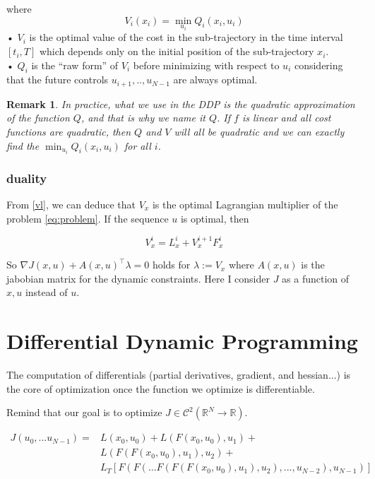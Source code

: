 \documentclass{report}
\newtheorem*{remark}{Remark}
\begin{document}
where
\begin{equation}
V_i(x_i) = \min_{u_i} Q_i(x_i, u_i) 
\end{equation}•
$V_i$ is the optimal value of the cost in the sub-trajectory in the time interval $[t_i, T]$ which depends only on the initial position of the sub-trajectory $x_i$.
\\•
$Q_i$ is the ``raw form'' of $V_i$ before minimizing with respect to $u_i$ considering that the future controls $u_{i+1}, .., u_{N-1}$ are always optimal. 

\begin{remark}
In practice, what we use in the DDP is the quadratic approximation of the function $Q$, and that is why we name it $Q$. If $f$ is linear and all cost functions are quadratic, then $Q$ and $V$ will all be quadratic and we can exactly find the $\min_{u_i} Q_i(x_i, u_i) $ for all $i$.
\end{remark}

\subsection*{duality}
From \ref{vl}, we can deduce that $V_x$ is the optimal Lagrangian multiplier of the problem \ref{eq:problem}.
If the sequence $u$ is optimal, then

\begin{equation}
V_x^i = L_x^i + V_x^{i+1} F_x^i
\end{equation}

So $\nabla J (x, u) + A(x, u)^\top \lambda = 0$ holds for $\lambda  := V_x$ where $A(x,u)$ is the jabobian matrix for the dynamic constraints. Here I consider $J$ as a function of $x, u$ instead of $u$.

\chapter{Differential Dynamic Programming}

The computation of differentials (partial derivatives, gradient, and hessian...) is the core of optimization once the function we optimize is differentiable.

Remind that our goal is to optimize $J \in \mathscr{C}^2 (\mathbb{R}^N \to \mathbb{R})$.

\begin{equation}
\begin{split}
J(u_0, ...u_{N-1}) = &L(x_0, u_0) + L(F(x_0, u_0), u_1) + \\
	&L(F(F(x_0, u_0), u_1), u_2) + \\
	&L_T[F(F(...F(F(F(x_0, u_0), u_1), u_2), ..., u_{N-2}) ,u_{N-1})]
\end{split}
\end{equation}
\end{document}
